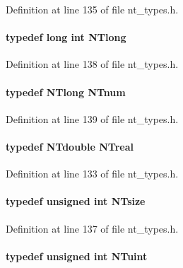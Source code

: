 Definition at line 135 of file nt\_\-types.h.

\paragraph[{NTlong}]{\setlength{\rightskip}{0pt plus 5cm}typedef long int {\bf NTlong}}\hfill\label{nt__types_8h_a66974263168dc9ddcc3a275844dc632f}


Definition at line 138 of file nt\_\-types.h.

\paragraph[{NTnum}]{\setlength{\rightskip}{0pt plus 5cm}typedef {\bf NTlong} {\bf NTnum}}\hfill\label{nt__types_8h_a2b739eac0beddc8a5dac5311c2ba7320}


Definition at line 139 of file nt\_\-types.h.

\paragraph[{NTreal}]{\setlength{\rightskip}{0pt plus 5cm}typedef {\bf NTdouble} {\bf NTreal}}\hfill\label{nt__types_8h_a814a97893e9deb1eedcc7604529ba80d}


Definition at line 133 of file nt\_\-types.h.

\paragraph[{NTsize}]{\setlength{\rightskip}{0pt plus 5cm}typedef unsigned int {\bf NTsize}}\hfill\label{nt__types_8h_a06c124f2e4469769b58230253ce0560b}


Definition at line 137 of file nt\_\-types.h.

\paragraph[{NTuint}]{\setlength{\rightskip}{0pt plus 5cm}typedef unsigned int {\bf NTuint}}\hfill\label{nt__types_8h_ac503559f358539d91155f135ee7a365d}


